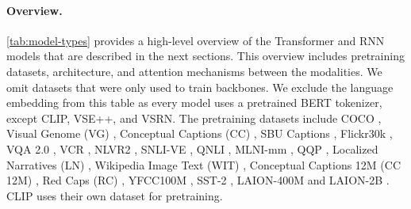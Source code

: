 \paragraph{Overview.}
\cref{tab:model-types} provides a high-level overview of the Transformer and RNN models that are described in the next sections. This overview includes pretraining datasets, architecture, and attention mechanisms between the modalities. We omit datasets that were only used to train backbones. We exclude the language embedding from this table as every model uses a pretrained BERT tokenizer, except CLIP, VSE++, and VSRN. The pretraining datasets include COCO \cite{lin2014microsoft}, Visual Genome (VG) \cite{krishna2016visual}, Conceptual Captions (CC) \cite{sharma2018conceptual}, SBU Captions \cite{ordonez2011im2text}, Flickr30k \cite{young2014image}, VQA 2.0 \cite{goyal2017making}, VCR \cite{zellers2019recognition}, NLVR2 \cite{suhr2017corpus}, SNLI-VE \cite{xie2018visual}, QNLI \cite{rajpurkar2016squad}, MLNI-mm \cite{williams2017broad}, QQP \cite{QQPDataset}, Localized Narratives (LN) \cite{pont-tuset2020localized-narratives}, Wikipedia Image Text (WIT) \cite{srinivasan2021wit}, Conceptual Captions 12M (CC 12M) \cite{changpinyo2021conceptual12m}, Red Caps (RC) \cite{desai2021redcaps}, YFCC100M \cite{thomee2016yfcc100m}, SST-2 \cite{Socher2013RecursiveDM}, LAION-400M \cite{schuhmann2021laion} and LAION-2B \cite{schuhmann2022laionb}. CLIP uses their own dataset for pretraining.

